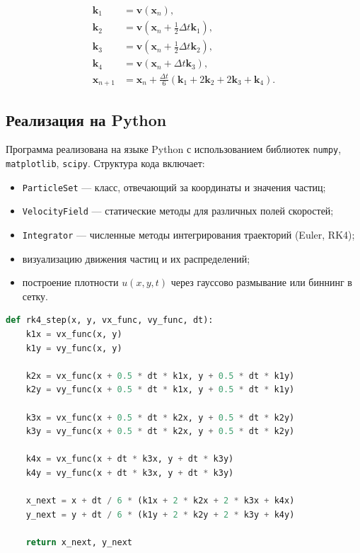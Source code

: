 \begin{equation}
	\begin{aligned}
		\mathbf{k}_1 &= \mathbf{v}(\mathbf{x}_n), \\
		\mathbf{k}_2 &= \mathbf{v}(\mathbf{x}_n + \tfrac{1}{2} \Delta t \mathbf{k}_1), \\
		\mathbf{k}_3 &= \mathbf{v}(\mathbf{x}_n + \tfrac{1}{2} \Delta t \mathbf{k}_2), \\
		\mathbf{k}_4 &= \mathbf{v}(\mathbf{x}_n + \Delta t \mathbf{k}_3), \\
		\mathbf{x}_{n+1} &= \mathbf{x}_n + \frac{\Delta t}{6} (\mathbf{k}_1 + 2\mathbf{k}_2 + 2\mathbf{k}_3 + \mathbf{k}_4).
	\end{aligned}
	\label{eq:rk4}
\end{equation}

\subsection{Реализация на Python}

Программа реализована на языке Python с использованием библиотек \texttt{numpy}, \texttt{matplotlib}, \texttt{scipy}. Структура кода включает:
\begin{itemize}
	\item \texttt{ParticleSet} — класс, отвечающий за координаты и значения частиц;
	\item \texttt{VelocityField} — статические методы для различных полей скоростей;
	\item \texttt{Integrator} — численные методы интегрирования траекторий (Euler, RK4);
	\item визуализацию движения частиц и их распределений;
	\item построение плотности \( u(x, y, t) \) через гауссово размывание или биннинг в сетку.
\end{itemize}

\begin{lstlisting}[language=Python, caption={Основной шаг метода Рунге–Кутты 4-го порядка для перемещения частиц}, label={lst:rk4_loop}]
	def rk4_step(x, y, vx_func, vy_func, dt):
	k1x = vx_func(x, y)
	k1y = vy_func(x, y)
	
	k2x = vx_func(x + 0.5 * dt * k1x, y + 0.5 * dt * k1y)
	k2y = vy_func(x + 0.5 * dt * k1x, y + 0.5 * dt * k1y)
	
	k3x = vx_func(x + 0.5 * dt * k2x, y + 0.5 * dt * k2y)
	k3y = vy_func(x + 0.5 * dt * k2x, y + 0.5 * dt * k2y)
	
	k4x = vx_func(x + dt * k3x, y + dt * k3y)
	k4y = vy_func(x + dt * k3x, y + dt * k3y)
	
	x_next = x + dt / 6 * (k1x + 2 * k2x + 2 * k3x + k4x)
	y_next = y + dt / 6 * (k1y + 2 * k2y + 2 * k3y + k4y)
	
	return x_next, y_next
\end{lstlisting}


